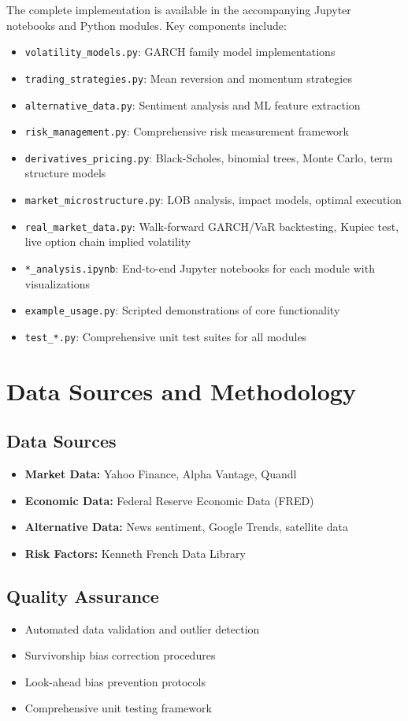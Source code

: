 \documentclass[12pt,a4paper]{article}
\begin{document}
The complete implementation is available in the accompanying Jupyter notebooks and Python modules. Key components include:

\begin{itemize}
    \item \texttt{volatility\_models.py}: GARCH family model implementations
    \item \texttt{trading\_strategies.py}: Mean reversion and momentum strategies
    \item \texttt{alternative\_data.py}: Sentiment analysis and ML feature extraction
    \item \texttt{risk\_management.py}: Comprehensive risk measurement framework
    \item \texttt{derivatives\_pricing.py}: Black-Scholes, binomial trees, Monte Carlo, term structure models
    \item \texttt{market\_microstructure.py}: LOB analysis, impact models, optimal execution
    \item \texttt{real\_market\_data.py}: Walk-forward GARCH/VaR backtesting, Kupiec test, live option chain implied volatility
    \item \texttt{*\_analysis.ipynb}: End-to-end Jupyter notebooks for each module with visualizations
    \item \texttt{example\_usage.py}: Scripted demonstrations of core functionality
    \item \texttt{test\_*.py}: Comprehensive unit test suites for all modules
\end{itemize}

\section{Data Sources and Methodology}

\subsection{Data Sources}
\begin{itemize}
    \item \textbf{Market Data:} Yahoo Finance, Alpha Vantage, Quandl
    \item \textbf{Economic Data:} Federal Reserve Economic Data (FRED)
    \item \textbf{Alternative Data:} News sentiment, Google Trends, satellite data
    \item \textbf{Risk Factors:} Kenneth French Data Library
\end{itemize}

\subsection{Quality Assurance}
\begin{itemize}
    \item Automated data validation and outlier detection
    \item Survivorship bias correction procedures
    \item Look-ahead bias prevention protocols
    \item Comprehensive unit testing framework
\end{itemize}
\end{document}
